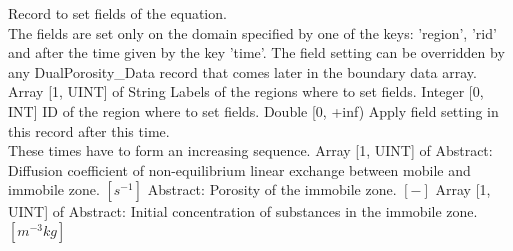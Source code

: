 \begin{RecordType}
	{}
	{} %
	{} %
	{} %
	{{{Record to set fields of the equation.}\\{
The fields are set only on the domain specified by one of the keys: 'region', 'rid'}\\{
and after the time given by the key 'time'. The field setting can be overridden by}\\{
 any DualPorosity{\_}Data record that comes later in the boundary data array.}}}
		\KeyItem
			{}
			{{Array [1, UINT] of }{String}}
			{\textrangle}
			{} %
			{{{Labels of the regions where to set fields. }}}
		\KeyItem
			{}
			{{Integer [0, INT]}}
			{\textrangle}
			{} %
			{{{ID of the region where to set fields.}}}
		\KeyItem
			{}
			{{Double [0, +inf)}}
			{\textrangle}
			{} %
			{{{Apply field setting in this record after this time.}\\{
These times have to form an increasing sequence.}}}
		\KeyItem
			{}
			{{Array [1, UINT] of }{Abstract}{: }}
			{\textrangle}
			{} %
			{{{Diffusion coefficient of non-equilibrium linear exchange between mobile and immobile zone. }{$[s^{-1}]$}}}
		\KeyItem
			{}
			{{Abstract}{: }}
			{\textrangle}
			{} %
			{{{Porosity of the immobile zone. }{$[-]$}}}
		\KeyItem
			{}
			{{Array [1, UINT] of }{Abstract}{: }}
			{\textrangle}
			{} %
			{{{Initial concentration of substances in the immobile zone. }{$[m^{-3}kg]$}}}
\end{RecordType}
\begin{RecordType}
	{}
	{} %
	{} %
	{} %
	{}
\end{RecordType}
